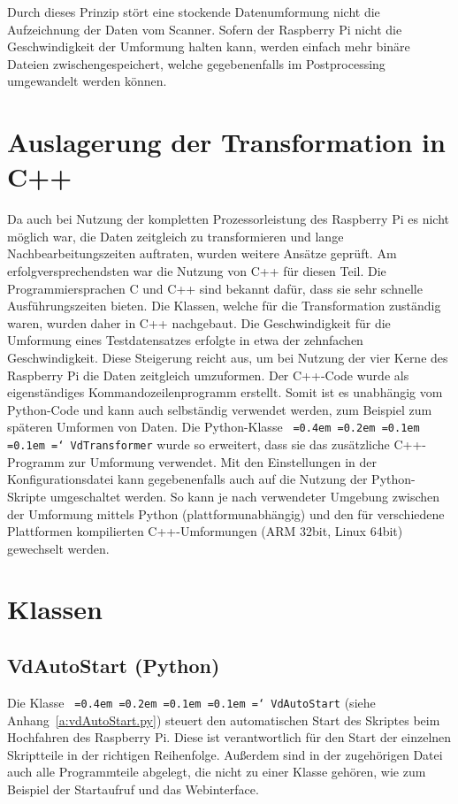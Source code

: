 \documentclass[a4paper,12pt,bibliography=totoc, listof=totoc,titlepage,pointlessnumbers]{scrreprt}
\newcommand*\justify{%
  \fontdimen2\font=0.4em%
  \fontdimen3\font=0.2em%
  \fontdimen4\font=0.1em%
  \fontdimen7\font=0.1em%
  \hyphenchar\font=`\-%
}
\newcommand{\code}[1]{\texttt{\justify{#1}}}
\begin{document}
Durch dieses Prinzip stört eine stockende Datenumformung nicht die Aufzeichnung der Daten vom Scanner. Sofern der Rasp\-berry Pi nicht die Geschwindigkeit der Umformung halten kann, werden einfach mehr binäre Dateien zwischengespeichert, welche gegebenenfalls im Postprocessing umgewandelt werden können.

\section{Auslagerung der Transformation in C++}
Da auch bei Nutzung der kompletten Prozessorleistung des Rasp\-berry Pi es nicht möglich war, die Daten zeitgleich zu transformieren und lange Nachbearbeitungszeiten auftraten, wurden weitere Ansätze geprüft. Am erfolgversprechendsten war die Nutzung von C++ für diesen Teil. Die Programmiersprachen C und C++ sind bekannt dafür, dass sie sehr schnelle Aus\-füh\-rungs\-zei\-ten bieten. Die Klassen, welche für die Transformation zuständig waren, wurden daher in C++ nachgebaut. Die Geschwindigkeit für die Umformung eines Testdatensatzes erfolgte in etwa der zehnfachen Geschwindigkeit. Diese Steigerung reicht aus, um bei Nutzung der vier Kerne des Rasp\-berry Pi die Daten zeitgleich umzuformen. Der C++-Code wurde als eigenständiges Kommandozeilenprogramm erstellt. Somit ist es unabhängig vom Python-Code und kann auch selbständig verwendet werden, zum Beispiel zum späteren Umformen von Daten.
Die Python-Klasse \code{VdTransformer} wurde so erweitert, dass sie das zu\-sätz\-liche C++-Programm zur Umformung verwendet. Mit den Einstellungen in der Konfigurationsdatei kann gegebenenfalls auch auf die Nutzung der Python-Skripte umgeschaltet werden. So kann je nach verwendeter Umgebung zwischen der Umformung mittels Python (plattformunabhängig) und den für verschiedene Plattformen kompilierten C++-Umformungen (ARM 32bit, Linux 64bit) gewechselt werden.

\section{Klassen}
\label{s:klassen}

\subsection{VdAutoStart (Python)}
Die Klasse \code{VdAutoStart} (siehe Anhang~\ref{a:vdAutoStart.py}) steuert den automatischen Start des Skriptes beim Hochfahren des Rasp\-berry Pi. Diese ist verantwortlich für den Start der einzelnen Skriptteile in der richtigen Reihenfolge. Außerdem sind in der zugehörigen Datei auch alle Programmteile abgelegt, die nicht zu einer Klasse gehören, wie zum Beispiel der Startaufruf und das Webinterface.
\end{document}
